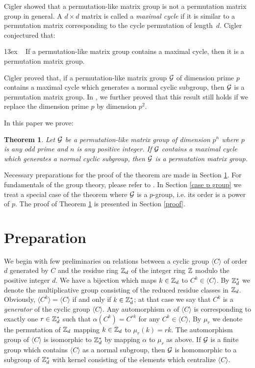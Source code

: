 \documentclass{article}
\newtheorem{theorem}{Theorem}[section]
\numberwithin{equation}{section}
\begin{document}
Cigler \cite{C05,C07} showed that a permutation-like matrix group
is not a permutation matrix group in general.
A $d\times d$ matrix is called a {\em maximal cycle} if
it is similar to a permutation matrix corresponding
to the cycle permutation of length~$d$.
Cigler conjectured that:

\hangindent13ex
~
{If a permutation-like matrix group contains a maximal cycle, then
it is a permutation matrix group.}

Cigler \cite{C05,C07} proved that, if a permutation-like matrix group ${\cal G}$
of dimension prime $p$ contains a maximal cycle which generates
a normal cyclic subgroup, then ${\cal G}$ is a permutation matrix group.
In \cite{DF}, we further proved that this result still holds 
if we replace the dimension prime $p$ by dimension $p^2$.

In this paper we prove:

\begin{theorem}\label{main}
Let ${\cal G}$ be a permutation-like matrix group of dimension $p^n$ 
where $p$ is any odd prime and $n$ is any positive integer.
If ${\cal G}$ contains a maximal cycle which generates
a normal cyclic subgroup, then ${\cal G}$ is a permutation matrix group.
\end{theorem}


Necessary preparations for the proof of the theorem are made in Section \ref{pre}.
For fundamentals of the group theory, please refer to \cite{AB,R}.
In Section \ref{case p group} we treat a special case of the theorem
where ${\cal G}$ is a $p$-group, i.e. its order is a power of $p$.
The proof of Theorem \ref{main} is presented in Section \ref{proof}.


\section{Preparation}\label{pre}

We begin with few preliminaries on relations between
a cyclic group $\langle C\rangle$ of order $d$ generated by $C$
and the residue ring ${\Bbb Z}_{d}$ of the integer ring ${\Bbb Z}$
modulo the positive integer $d$.
We have a bijection which maps $k\in{\Bbb Z}_{d}$ to $C^k\in\langle C\rangle$.
By ${\Bbb Z}_d^*$ we denote the multiplicative group consisting
of the reduced residue classes in ${\Bbb Z}_{d}$.  Obviously,
$\langle C^k\rangle=\langle C\rangle$ if and only if
$k\in{\Bbb Z}_d^*$; at that case we say that $C^k$
is a {\em generator} of the cyclic group $\langle C\rangle$.
Any automorphism $\alpha$ of $\langle C\rangle$ is corresponding to exactly
one $r\in{\Bbb Z}_d^*$ such that
$\alpha(C^k)=C^{rk}$ for any $C^k\in\langle C\rangle$,
By $\mu_r$ we denote the permutation of ${\Bbb Z}_d$
mapping $k\in{\Bbb Z}_{d}$ to $\mu_r(k)=rk$.
The automorphism group of $\langle C\rangle$
is isomorphic to ${\Bbb Z}_d^*$ by mapping $\alpha$ to $\mu_r$ as above.
If ${\cal G}$ is a finite group which contains $\langle C\rangle$
as a normal subgroup,
then ${\cal G}$ is homomorphic to a subgroup
of ${\Bbb Z}_d^*$ with kernel consisting of
the elements which centralize $\langle C\rangle$.
\end{document}
